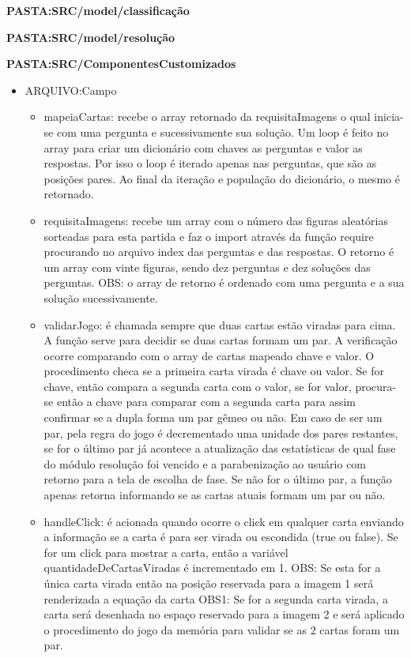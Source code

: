 \textbf{PASTA:SRC/model/classificação}

\textbf{PASTA:SRC/model/resolução}


\textbf{PASTA:SRC/ComponentesCustomizados}
\begin{itemize}
\item ARQUIVO:Campo
	\begin{itemize}
	\item mapeiaCartas: recebe o array retornado da requisitaImagens o qual inicia-se com uma pergunta e sucessivamente sua solução. Um loop é feito no array para criar um dicionário com chaves as perguntas e valor as respostas. Por isso o loop é iterado apenas nas perguntas, que são as posições pares. Ao final da iteração e população do dicionário, o mesmo é retornado.
	
	\item requisitaImagens: recebe um array com o número das figuras aleatórias sorteadas para esta partida e faz o import através da função require procurando no arquivo index das perguntas e das respostas. O retorno é um array com vinte figuras, sendo dez perguntas e dez soluções das perguntas. OBS: o array de retorno é ordenado com uma pergunta e a sua solução sucessivamente.

	\item validarJogo: é chamada sempre que duas cartas estão viradas para cima. A função serve para decidir se duas cartas formam um par. A verificação ocorre comparando com o array de cartas mapeado chave e valor. O procedimento checa se a primeira carta virada é chave ou valor. Se for chave, então compara a segunda carta com o valor, se for valor, procura-se então a chave para comparar com a segunda carta para assim confirmar se a dupla forma um par gêmeo ou não. Em caso de ser um par, pela regra do jogo é decrementado uma unidade dos pares restantes, se for o último par já acontece a atualização das estatísticas de qual fase do módulo resolução foi vencido e a parabenização ao usuário com retorno para a tela de escolha de fase. Se não for o último par, a função apenas retorna informando se as cartas atuais formam um par ou não.

	\item handleClick: é acionada quando ocorre o click em qualquer carta enviando a informação se a carta é para ser virada ou escondida (true ou false). Se for um click para mostrar a carta, então a variável quantidadeDeCartasViradas é incrementado em 1. 
	OBS: Se esta for a única carta virada então na posição reservada para a imagem 1 será renderizada a equação da carta
	OBS1: Se for a segunda carta virada, a carta será desenhada no espaço reservado para a imagem 2 e será aplicado o procedimento do jogo da memória para validar se as 2 cartas foram um par. 


\end{itemize}
\end{itemize}
